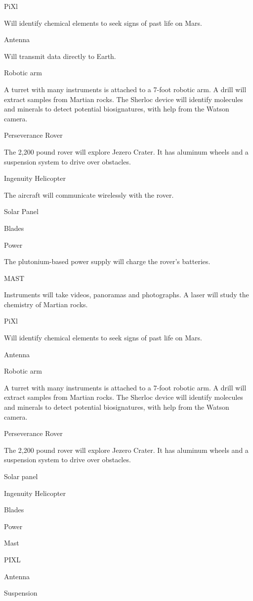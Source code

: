 PiXl

Will identify chemical elements to seek signs of past life on Mars.

Antenna

Will transmit data directly to Earth.

Robotic arm

A turret with many instruments is attached to a 7-foot robotic arm. A
drill will extract samples from Martian rocks. The Sherloc device will
identify molecules and minerals to detect potential biosignatures, with
help from the Watson camera.

Perseverance Rover

The 2,200 pound rover will explore Jezero Crater. It has aluminum wheels
and a suspension system to drive over obstacles.

Ingenuity Helicopter

The aircraft will communicate wirelessly with the rover.

Solar Panel

Blades

Power

The plutonium-based power supply will charge the rover's batteries.

MAST

Instruments will take videos, panoramas and photographs. A laser will
study the chemistry of Martian rocks.

PiXl

Will identify chemical elements to seek signs of past life on Mars.

Antenna

Robotic arm

A turret with many instruments is attached to a 7-foot robotic arm. A
drill will extract samples from Martian rocks. The Sherloc device will
identify molecules and minerals to detect potential biosignatures, with
help from the Watson camera.

Perseverance Rover

The 2,200 pound rover will explore Jezero Crater. It has aluminum wheels
and a suspension system to drive over obstacles.

Solar panel

Ingenuity Helicopter

Blades

Power

Mast

PIXL

Antenna

Suspension

